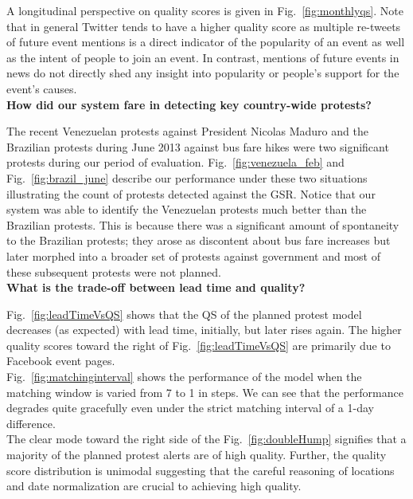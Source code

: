 \documentclass[letterpaper]{article}
\begin{document}
A longitudinal perspective on quality scores is given in
Fig.~\ref{fig:monthlyqs}. Note that in general Twitter tends to have a
higher quality score as multiple re-tweets of future event mentions is a
direct indicator of the popularity of an event as well as the intent of
people to join an event.  In contrast, mentions of future events in news
do not directly shed any insight into popularity or people's support for
the event's causes.\\

\noindent
{\bf How did our system fare in detecting key country-wide protests?}

The recent Venezuelan protests against President Nicolas Maduro and the
Brazilian protests during June 2013 against bus fare hikes were two
significant protests during our period of evaluation.
Fig.~\ref{fig:venezuela_feb} and Fig.~\ref{fig:brazil_june} describe our
performance under these two situations illustrating the count of
protests detected against the GSR. Notice that our system was able to
identify the Venezuelan protests much better than the Brazilian
protests. This is because there was a significant amount of spontaneity
to the Brazilian protests; they arose as discontent about bus fare
increases but later morphed into a broader set of protests against
government and most of these subsequent protests were not planned.\\

\noindent
{\bf What is the trade-off between lead time and quality?}

Fig.~\ref{fig:leadTimeVsQS} shows that the QS of the planned protest
model decreases (as expected) with lead time, initially, but later rises
again. The higher quality scores toward the right of
Fig.~\ref{fig:leadTimeVsQS} are primarily due to Facebook event pages.\\

 Fig.~\ref{fig:matchinginterval} shows the performance of the
model when the matching window is varied from 7 to 1 in steps.  We can
see that the performance degrades quite gracefully even under the strict
matching interval of a 1-day difference.\\

 The clear
mode toward the right side of the Fig.~\ref{fig:doubleHump} signifies
that a majority of the planned protest alerts are of high quality.
Further, the quality score distribution is unimodal suggesting that the
careful reasoning of locations and date normalization are crucial to
achieving high quality.
\end{document}

